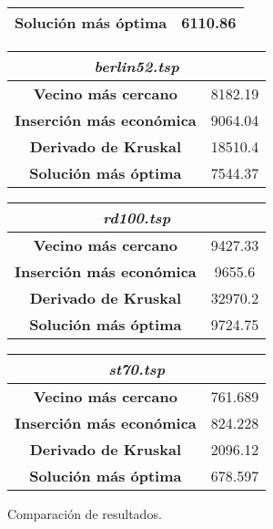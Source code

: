 \documentclass[12pt,spanish]{article}
\begin{document}
\begin{figure}[H]
\begin{tabular}{|c|c|}
\textbf{Solución más óptima} & 6110.86\\
\hline	
\end{tabular}
\vspace{0.5cm}
\quad
\begin{tabular}{|c|c|}
\hline	
\multicolumn{2}{|c|}{\textit{berlin52.tsp}}\\
\hline
\textbf{Vecino más cercano} & 8182.19\\
\textbf{Inserción más económica} & 9064.04\\
\textbf{Derivado de Kruskal} & 18510.4\\
\textbf{Solución más óptima} & 7544.37\\
\hline	
\end{tabular}
\vspace{0.5cm}
\quad
\begin{tabular}{|c|c|}
\hline	
\multicolumn{2}{|c|}{\textit{rd100.tsp}}\\
\hline
\textbf{Vecino más cercano} & 9427.33\\
\textbf{Inserción más económica} & 9655.6\\
\textbf{Derivado de Kruskal} & 32970.2\\
\textbf{Solución más óptima} & 9724.75\\
\hline	
\end{tabular}
\vspace{0.5cm}
\quad
\begin{tabular}{|c|c|}
\hline	
\multicolumn{2}{|c|}{\textit{st70.tsp}}\\
\hline
\textbf{Vecino más cercano} & 761.689\\
\textbf{Inserción más económica} & 824.228\\
\textbf{Derivado de Kruskal} & 2096.12\\
\textbf{Solución más óptima} & 678.597 \\
\hline	
\end{tabular}
\caption{Comparación de resultados.}
\end{figure}
\end{document}
